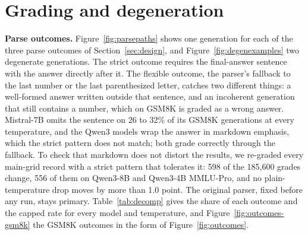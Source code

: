 \documentclass[11pt]{article}
\begin{document}
\begin{table}[t]\centering
\caption{Engine, precision, and build checks: plain-temperature accuracy at $T{=}0.7$ and
$1.3$, the drop with its 95\% item-clustered interval, the capped rate at 1.3 (\%), and the
difference of the drop from the reference Q8\_0 llama.cpp cell on the same items (positive: a
larger drop than the reference). The BF16 GGUF row of Qwen3-4B belongs to the main grid.}
\label{tab:engine-full}
\footnotesize\setlength{\tabcolsep}{3pt}\resizebox{\textwidth}{!}{}
\end{table}

\section{Grading and degeneration}
\label{app:grading}

\textbf{Parse outcomes.} Figure~\ref{fig:parsepaths} shows one generation for each of the
three parse outcomes of Section~\ref{sec:design}, and Figure~\ref{fig:degenexamples} two
degenerate generations. The strict outcome requires the final-answer sentence with the answer
directly after it. The flexible outcome, the parser's fallback to the last number or the last
parenthesized letter, catches two different things: a well-formed answer written outside that
sentence, and an incoherent generation that still contains a number, which on GSM8K is graded
as a wrong answer. Mistral-7B omits the sentence on 26 to 32\% of its GSM8K generations at
every temperature, and the Qwen3 models wrap the answer in markdown emphasis, which the strict
pattern does not match; both grade correctly through the fallback. To check that markdown does
not distort the results, we re-graded every main-grid record with a strict pattern that
tolerates it: 598 of the 185,600 grades change, 556 of them on Qwen3-8B and Qwen3-4B MMLU-Pro,
and no plain-temperature drop moves by more than 1.0 point. The original parser, fixed before
any run, stays primary. Table~\ref{tab:decomp} gives the share of each outcome and the capped
rate for every model and temperature, and Figure~\ref{fig:outcomes-gsm8k} the GSM8K outcomes
in the form of Figure~\ref{fig:outcomes}.
\end{document}
